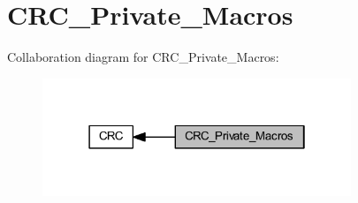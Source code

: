 \hypertarget{group___c_r_c___private___macros}{}\section{C\+R\+C\+\_\+\+Private\+\_\+\+Macros}
\label{group___c_r_c___private___macros}
Collaboration diagram for C\+R\+C\+\_\+\+Private\+\_\+\+Macros\+:
\nopagebreak
\begin{figure}[H]
\begin{center}
\leavevmode
\includegraphics[width=262pt]{group___c_r_c___private___macros}
\end{center}
\end{figure}
